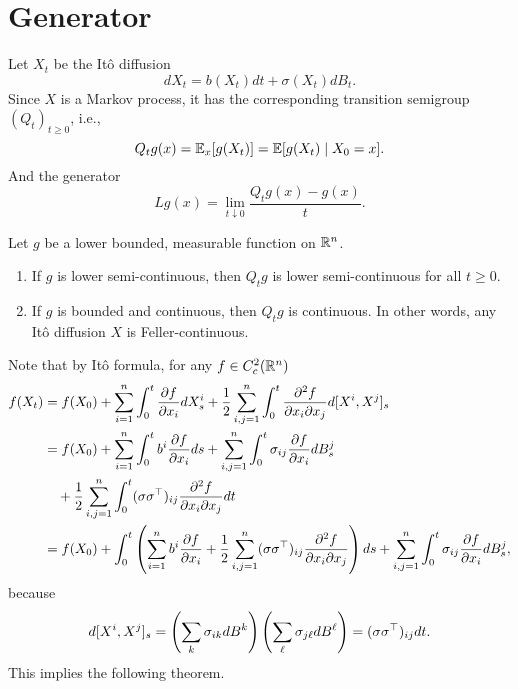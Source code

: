 \section{Generator}

Let $X_t$ be the It\^o diffusion
\begin{equation*}
	dX_t = b(X_t)dt + \sigma(X_t)dB_t.
\end{equation*}
Since $X$ is a Markov process, it has the corresponding transition semigroup $(Q_t)_{t \geq 0}$, i.e.,
\begin{equation*}
	Q_tg(x) = \mathbb{E}_x[g(X_t)] = \mathbb{E}[g(X_t) \mid X_0 = x].
\end{equation*}
And the generator
\begin{equation*}
    Lg(x) = \lim_{t \downarrow 0} \frac{Q_tg(x) - g(x)}{t}.
\end{equation*}

\begin{lem}
    Let $g$ be a lower bounded, measurable function on $\mathbb{R}^n$.
    \begin{enumerate}[label=(\arabic{*})]
    	\item If $g$ is lower semi-continuous, then $Q_t g$ is lower semi-continuous for all $t \geq 0$.
    	\item If $g$ is bounded and continuous, then $Q_t g$ is continuous. In other words, any It\^o diffusion $X$ is Feller-continuous.
    \end{enumerate} 
\end{lem}

\noindent Note that by It\^o formula, for any $f \in C_c^2(\mathbb{R}^n)$
\begin{align*}
	f(X_t) &= f(X_0) + \sum_{i=1}^n\int_0^t \frac{\partial f}{\partial x_i}dX^i_s + \frac{1}{2} \sum_{i,j=1}^n \int_0^t\frac{\partial^2 f}{\partial x_i \partial x_j}d[X^i,X^j]_s \\
	&= f(X_0) + \sum_{i=1}^n\int_0^t b^i\frac{\partial f}{\partial x_i}ds + \sum_{i,j=1}^n\int_0^t \sigma_{ij} \frac{\partial f}{\partial x_i}dB^j_s \\
	&\quad + \frac{1}{2} \sum_{i,j=1}^n \int_0^t (\sigma \sigma^\top)_{ij} \frac{\partial^2 f}{\partial x_i \partial x_j} dt \\
	&= f(X_0) + \int_0^t \left( \sum_{i=1}^n b^i\frac{\partial f}{\partial x_i} + \frac{1}{2} \sum_{i,j=1}^n (\sigma \sigma^\top)_{ij} \frac{\partial^2 f}{\partial x_i \partial x_j} \right)ds + \sum_{i,j=1}^n\int_0^t \sigma_{ij} \frac{\partial f}{\partial x_i}dB^j_s,
\end{align*}
because
\begin{equation*}
	d[X^i,X^j]_s = \left(\sum_k \sigma_{ik}dB^k\right)\left(\sum_\ell \sigma_{j\ell}dB^\ell\right) = (\sigma \sigma^\top)_{ij}dt.
\end{equation*}
This implies the following theorem.

